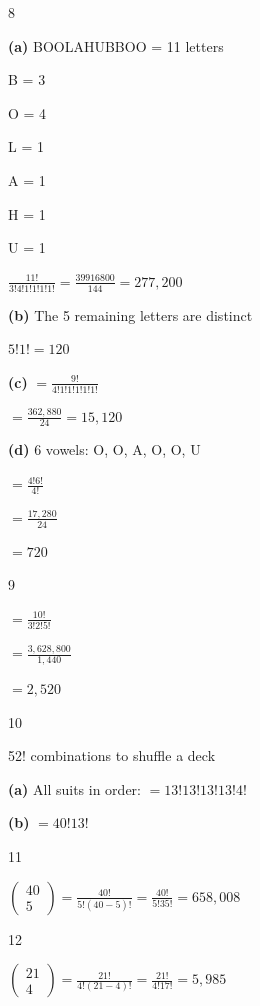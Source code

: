 \documentclass[12 pt]{article}
\begin{document}
    \begin{exercise}{8}
    \hfill

        \textbf{(a)} BOOLAHUBBOO = 11 letters

        B = 3

        O = 4

        L = 1

        A = 1

        H = 1

        U = 1

        $\frac{11!}{3!4!1!1!1!1!} = \frac{39916800}{144} = 277,200$

        \textbf{(b)} The 5 remaining letters are distinct

        $5!1! = 120$

        \textbf{(c)} $= \frac{9!}{4!1!1!1!1!1!}$

        $= \frac{362,880}{24} = 15,120$
        

        \textbf{(d)} 6 vowels: O, O, A, O, O, U

        $= \frac{4!6!}{4!}$

        $= \frac{17,280}{24}$

        $= 720$        
    \end{exercise}

    \begin{exercise}{9}
    \hfill

        $= \frac{10!}{3!2!5!}$

        $= \frac{3,628,800}{1,440}$   

        $= 2,520$
    \end{exercise}

    \begin{exercise}{10}
    \hfill

        52! combinations to shuffle a deck
        
        \textbf{(a)}  
            All suits in order: $= 13!13!13!13!4!$

        \textbf{(b)} $ = 40!13!$
        
    \end{exercise}

    \begin{exercise}{11}
    \hfill

        $\begin{pmatrix}
        40 \\
        5
        \end{pmatrix} = \frac{40!}{5!(40-5)!} = \frac{40!}{5!35!} = 658,008$   
    \end{exercise}

    \begin{exercise}{12}
    \hfill

        $\begin{pmatrix}
            21 \\
            4
        \end{pmatrix} = \frac{21!}{4!(21-4)!} = \frac{21!}{4!17!} = 5,985$
    \end{exercise}  
\end{document}
